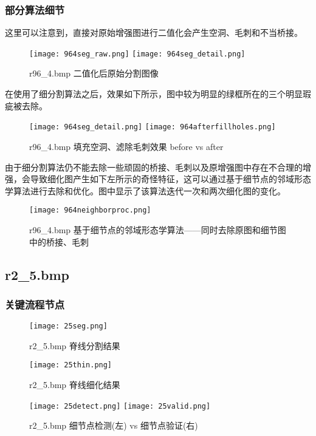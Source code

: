 \documentclass[UTF8]{ctexart}
\begin{document}
\subsubsection{部分算法细节}
这里可以注意到，直接对原始增强图进行二值化会产生空洞、毛刺和不当桥接。

\begin{figure}[H]
    \centering
    \texttt{[image: 964seg\_raw.png]}
    \texttt{[image: 964seg\_detail.png]}
    \caption{r96\_4.bmp 二值化后原始分割图像}
\end{figure}

在使用了细分割算法之后，效果如下所示，图中较为明显的绿框所在的三个明显瑕疵被去除。
\begin{figure}[H]
    \centering
    \texttt{[image: 964seg\_detail.png]}
    \texttt{[image: 964afterfillholes.png]}
    \caption{r96\_4.bmp 填充空洞、滤除毛刺效果 before vs after}
\end{figure}

由于细分割算法仍不能去除一些顽固的桥接、毛刺以及原增强图中存在不合理的增强，会导致细化图产生如下左所示的奇怪特征，这可以通过基于细节点的邻域形态学算法进行去除和优化。图中显示了该算法迭代一次和两次细化图的变化。
\begin{figure}[H]
    \centering
    \texttt{[image: 964neighborproc.png]}
    \caption{r96\_4.bmp 基于细节点的邻域形态学算法——同时去除原图和细节图中的桥接、毛刺}
\end{figure}

\subsection{r2\_5.bmp}
\subsubsection{关键流程节点}
\begin{figure}[H]
    \centering
    \texttt{[image: 25seg.png]}
    \caption{r2\_5.bmp 脊线分割结果}
\end{figure}

\begin{figure}[H]
    \centering
    \texttt{[image: 25thin.png]}
    \caption{r2\_5.bmp 脊线细化结果}
\end{figure}

\begin{figure}[H]
    \centering
    \texttt{[image: 25detect.png]}
    \texttt{[image: 25valid.png]}
    \caption{r2\_5.bmp 细节点检测(左) vs 细节点验证(右)}
\end{figure}
\end{document}
